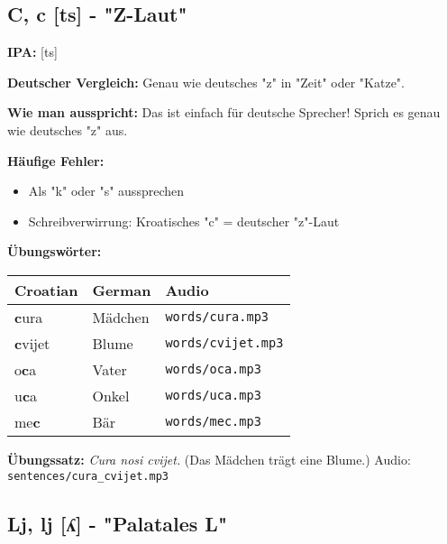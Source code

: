 \subsection{C, c [ts] - "Z-Laut"}

\begin{tcolorbox}[breakable, colback=lightyellow!30, colframe=orange, title=\textbf{C, c}]

\textbf{IPA:} [ts]

\textbf{Deutscher Vergleich:}
Genau wie deutsches "z" in "Zeit" oder "Katze".

\textbf{Wie man ausspricht:}
Das ist einfach für deutsche Sprecher! Sprich es genau wie deutsches "z" aus.

\textbf{Häufige Fehler:}
\begin{itemize}
    \item Als "k" oder "s" aussprechen
    \item Schreibverwirrung: Kroatisches "c" = deutscher "z"-Laut
\end{itemize}

\textbf{Übungswörter:}
\begin{center}
\small
\begin{tabular}{lll}
\textbf{Croatian} & \textbf{German} & \textbf{Audio} \\
\midrule
\textbf{c}ura & Mädchen & \small\texttt{words/cura.mp3} \\
\textbf{c}vijet & Blume & \small\texttt{words/cvijet.mp3} \\
o\textbf{c}a & Vater & \small\texttt{words/oca.mp3} \\
u\textbf{c}a & Onkel & \small\texttt{words/uca.mp3} \\
me\textbf{c} & Bär & \small\texttt{words/mec.mp3} \\
\end{tabular}
\end{center}

\textbf{Übungssatz:}
\textit{Cura nosi cvijet.}
(Das Mädchen trägt eine Blume.)
Audio: \small\texttt{sentences/cura\_cvijet.mp3}

\end{tcolorbox}

\subsection{Lj, lj [ʎ] - "Palatales L"}

